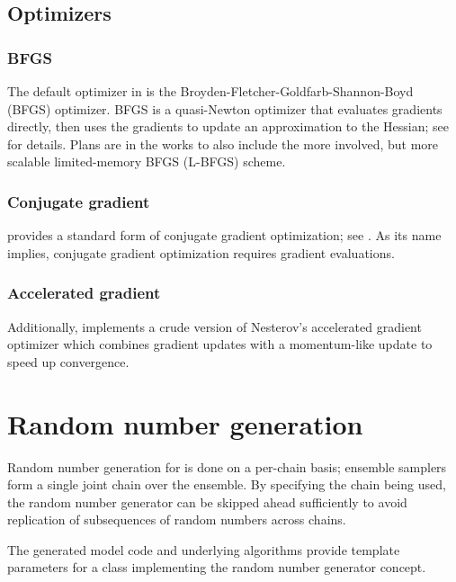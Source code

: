 \documentclass[article]{jss}
\begin{document}
\subsection{Optimizers}

\subsubsection{BFGS}

The default optimizer in  is the
Broyden-Fletcher-Goldfarb-Shannon-Boyd (BFGS) optimizer.  BFGS is a
quasi-Newton optimizer that evaluates gradients directly, then uses
the gradients to update an approximation to the Hessian; see
\citep{NocedalWright:2006} for details.  Plans are in the works to
also include the more involved, but more scalable limited-memory BFGS
(L-BFGS) scheme.

\subsubsection{Conjugate gradient}

 provides a standard form of conjugate gradient
optimization; see \citep{NocedalWright:2006}.  As its name implies,
conjugate gradient optimization requires gradient evaluations.

\subsubsection{Accelerated gradient}

Additionally,  implements a crude version of Nesterov's
accelerated gradient optimizer \cite{Nesterov:1983} which combines
gradient updates with a momentum-like update to speed up convergence.

\section{Random number generation}\label{rng.section}

Random number generation for  is done on a per-chain
basis; ensemble samplers form a single joint chain over the ensemble.  By
specifying the chain being used, the random number generator can be
skipped ahead sufficiently to avoid replication of subsequences of
random numbers across chains.

The generated model code and underlying  algorithms
provide template parameters for a class implementing the 
random number generator concept.  
\end{document}
